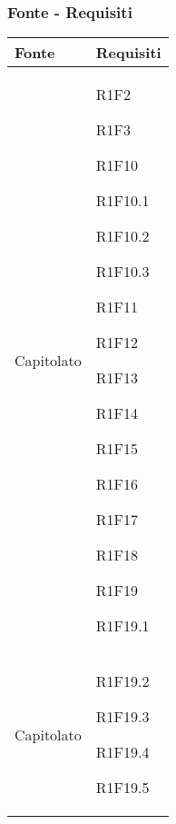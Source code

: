 \subsubsection{Fonte - Requisiti}
\begin{center}
	\begin{longtable}{|p{44mm}|p{22mm}|}
		\hline
		\rowcolor{lighter-grayer}
		\textbf{Fonte} &  \textbf{Requisiti}  \\
		\hline
		\endhead
		

Capitolato &

R1F2 \newline

R1F3 \newline

R1F10 \newline

R1F10.1 \newline

R1F10.2 \newline

R1F10.3 \newline

R1F11 \newline

R1F12 \newline

R1F13 \newline

R1F14 \newline

R1F15 \newline

R1F16 \newline

R1F17 \newline

R1F18 \newline

R1F19 \newline

R1F19.1
\\
\hline
Capitolato &
R1F19.2 \newline

R1F19.3 \newline

R1F19.4 \newline

R1F19.5 \newline


\end{longtable}
\end{center}
